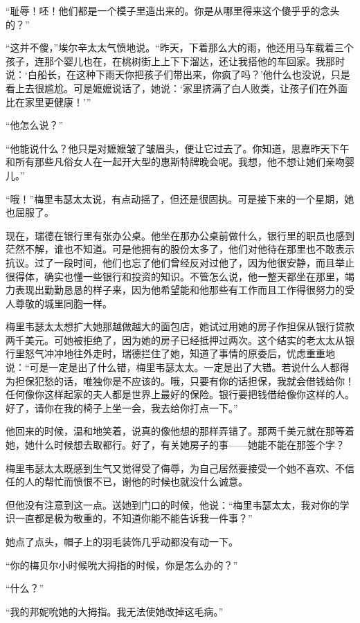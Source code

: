 \par “耻辱！呸！他们都是一个模子里造出来的。你是从哪里得来这个傻乎乎的念头的？”
\par “这并不傻，”埃尔辛太太气愤地说。“昨天，下着那么大的雨，他还用马车载着三个孩子，连那个婴儿也在，在桃树街上上下下溜达，还让我搭他的车回家。我那时说：‘白船长，在这种下雨天你把孩子们带出来，你疯了吗？’他什么也没说，只是看上去很尴尬。可是嬷嬷说话了，她说：‘家里挤满了白人败类，让孩子们在外面比在家里更健康！'”
\par “他怎么说？”
\par “他能说什么？他只是对嬷嬷皱了皱眉头，便让它过去了。你知道，思嘉昨天下午和所有那些凡俗女人在一起开大型的惠斯特牌晚会呢。我想，他不想让她们亲吻婴儿。”
\par “哦！”梅里韦瑟太太说，有点动摇了，但还是很固执。可是接下来的一个星期，她也屈服了。
\par 现在，瑞德在银行里有张办公桌。他坐在那办公桌前做什么，银行里的职员也感到茫然不解，谁也不知道。可是他拥有的股份太多了，他们对他待在那里也不敢表示抗议。过了一段时间，他们也忘了他们曾经反对过他了，因为他很安静，而且举止很得体，确实也懂一些银行和投资的知识。不管怎么说，他一整天都坐在那里，竭力表现出勤勤恳恳的样子来，因为他希望能和他那些有工作而且工作得很努力的受人尊敬的城里同胞一样。
\par 梅里韦瑟太太想扩大她那越做越大的面包店，她试过用她的房子作担保从银行贷款两千美元。可她被拒绝了，因为她的房子已经抵押过两次。这个结实的老太太从银行里怒气冲冲地往外走时，瑞德拦住了她，知道了事情的原委后，忧虑重重地说：“可是一定是出了什么错，梅里韦瑟太太。一定是出了大错。若说什么人都得为担保犯愁的话，唯独你是不应该的。哦，只要有你的话担保，我就会借钱给你！任何像你这样起家的夫人都是世界上最好的保险。银行要把钱借给像你这样的人。好了，请你在我的椅子上坐一会，我去给你打点一下。”
\par 他回来的时候，温和地笑着，说真的像他想的那样弄错了。那两千美元就在那等着她，她什么时候想去取都行。好了，有关她房子的事——她能不能在那签个字？
\par 梅里韦瑟太太既感到生气又觉得受了侮辱，为自己居然要接受一个她不喜欢、不信任的人的帮忙而愤恨不已，谢他的时候也就没什么诚意。
\par 但他没有注意到这一点。送她到门口的时候，他说：“梅里韦瑟太太，我对你的学识一直都是极为敬重的，不知道你能不能告诉我一件事？”
\par 她点了点头，帽子上的羽毛装饰几乎动都没有动一下。
\par “你的梅贝尔小时候吮大拇指的时候，你是怎么办的？”
\par “什么？”
\par “我的邦妮吮她的大拇指。我无法使她改掉这毛病。”
